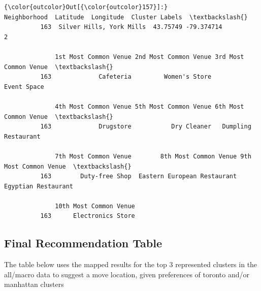 \documentclass[11pt]{article}
\begin{document}
\begin{Verbatim}[commandchars=\\\{\}]
{\color{outcolor}Out[{\color{outcolor}157}]:}                  Neighborhood  Latitude  Longitude  Cluster Labels  \textbackslash{}
          163  Silver Hills, York Mills  43.75749 -79.374714               2   
          
              1st Most Common Venue 2nd Most Common Venue 3rd Most Common Venue  \textbackslash{}
          163             Cafeteria         Women's Store           Event Space   
          
              4th Most Common Venue 5th Most Common Venue 6th Most Common Venue  \textbackslash{}
          163             Drugstore           Dry Cleaner   Dumpling Restaurant   
          
              7th Most Common Venue        8th Most Common Venue 9th Most Common Venue  \textbackslash{}
          163        Duty-free Shop  Eastern European Restaurant   Egyptian Restaurant   
          
              10th Most Common Venue  
          163      Electronics Store  
\end{Verbatim}
            
    \subsection{Final Recommendation
Table}\label{final-recommendation-table}

The table below uses the mapped results for the top 3 represented
clusters in the all/macro data to suggest a move location, given
preferences of toronto and/or manhattan clusters
\end{document}
